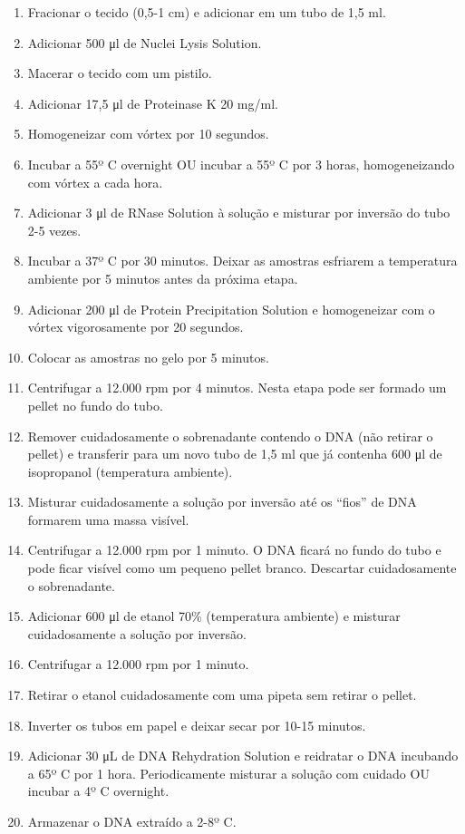 \documentclass[
  letterpaper,
  DIV=11,
  numbers=noendperiod]{scrreprt}
\begin{document}
\begin{enumerate}
\def\labelenumi{\arabic{enumi}.}
\item
  Fracionar o tecido (0,5-1 cm) e adicionar em um tubo de 1,5 ml.
\item
  Adicionar 500 μl de Nuclei Lysis Solution.
\item
  Macerar o tecido com um pistilo.
\item
  Adicionar 17,5 μl de Proteinase K 20 mg/ml.
\item
  Homogeneizar com vórtex por 10 segundos.
\item
  Incubar a 55º C overnight OU incubar a 55º C por 3 horas,
  homogeneizando com vórtex a cada hora.
\item
  Adicionar 3 μl de RNase Solution à solução e misturar por inversão do
  tubo 2-5 vezes.
\item
  Incubar a 37º C por 30 minutos. Deixar as amostras esfriarem a
  temperatura ambiente por 5 minutos antes da próxima etapa.
\item
  Adicionar 200 μl de Protein Precipitation Solution e homogeneizar com
  o vórtex vigorosamente por 20 segundos.
\item
  Colocar as amostras no gelo por 5 minutos.
\item
  Centrifugar a 12.000 rpm por 4 minutos. Nesta etapa pode ser formado
  um pellet no fundo do tubo.
\item
  Remover cuidadosamente o sobrenadante contendo o DNA (não retirar o
  pellet) e transferir para um novo tubo de 1,5 ml que já contenha 600
  μl de isopropanol (temperatura ambiente).
\item
  Misturar cuidadosamente a solução por inversão até os ``fios'' de DNA
  formarem uma massa visível.
\item
  Centrifugar a 12.000 rpm por 1 minuto. O DNA ficará no fundo do tubo e
  pode ficar visível como um pequeno pellet branco. Descartar
  cuidadosamente o sobrenadante.
\item
  Adicionar 600 μl de etanol 70\% (temperatura ambiente) e misturar
  cuidadosamente a solução por inversão.
\item
  Centrifugar a 12.000 rpm por 1 minuto.
\item
  Retirar o etanol cuidadosamente com uma pipeta sem retirar o pellet.
\item
  Inverter os tubos em papel e deixar secar por 10-15 minutos.
\item
  Adicionar 30 μL de DNA Rehydration Solution e reidratar o DNA
  incubando a 65º C por 1 hora. Periodicamente misturar a solução com
  cuidado OU incubar a 4º C overnight.
\item
  Armazenar o DNA extraído a 2-8º C.
\end{enumerate}
\end{document}
